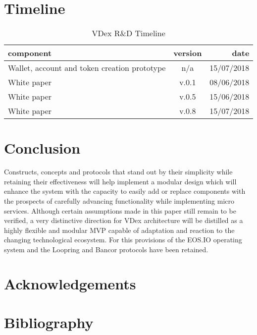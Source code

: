 \documentclass[]{article}
\begin{document}
\section{Timeline}	
\begin{table}[h!]
	\begin{center}
		\caption{VDex R\&D Timeline}
		\label{tab:table1}
		\begin{tabular}{l|c|r}
			\textbf{component} & \textbf{version}&  \textbf{date}  \\
			\hline
			Wallet, account and token creation prototype  & n/a & 15/07/2018\\
			\hline			
			White paper  & v.0.1 & 08/06/2018\\
			\hline
			White paper  & v.0.5 & 15/06/2018\\
			\hline
			White paper  & v.0.8  & 15/07/2018\\
			\hline
			
			
		\end{tabular}
	\end{center}
\end{table}
		
\section{Conclusion}
Constructs, concepts and protocols that stand out by their simplicity
while retaining their effectiveness will help implement a modular
design which will enhance the system with the capacity to easily add or replace components with the prospects of carefully advancing functionality while 
implementing micro services.
Although certain assumptions made in this paper still remain to be verified,
a very distinctive direction for VDex architecture will be distilled as a highly flexible and modular MVP capable of adaptation and reaction to the changing technological ecosystem.
For this provisions of the EOS.IO operating system and the Loopring and Bancor protocols have been retained. 


\section*{Acknowledgements}
\section*{Bibliography}



\cite{1}
\cite{2}
\cite{3}
\cite{4}
\cite{5}
\cite{6}
\cite{7}
\cite{8}
\cite{9}
\cite{10}
\cite{11}
\cite{12}
\cite{13}
\cite{14}
\cite{15}
\cite{16}
\cite{17}
\cite{18}
\cite{19}
\cite{20}
\cite{21}


 
\end{document}
